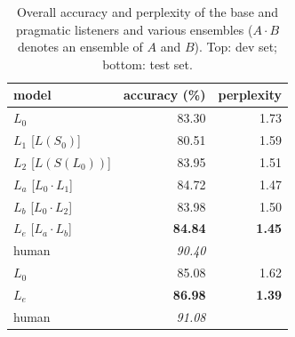 \documentclass[11pt,letterpaper]{article}
\newcommand{\Listener}{L}
\newcommand{\Speaker}{S}
\renewcommand{\|}{\mid}
\newcommand{\best}[1]{\textbf{#1}}
\newcommand{\oracle}[1]{\textit{#1}}
\newcommand{\secref}[1]{Section~\ref{#1}}
\begin{document}
\begin{table}[t]
\centering
\begin{tabular}{lrr}
  \toprule
  model & accuracy (\%) & perplexity \\
  \midrule
  $\Listener_0$                                      & 83.30 & 1.73 \\
  $\Listener_1$ [$\Listener(\Speaker_0)$]            & 80.51 & 1.59 \\
  $\Listener_2$ [$\Listener(\Speaker(\Listener_0))$] & 83.95 & 1.51 \\
  $\Listener_a$ [$\Listener_0 \cdot \Listener_1$]    & 84.72 & 1.47 \\
  $\Listener_b$ [$\Listener_0 \cdot \Listener_2$]    & 83.98 & 1.50 \\
  $\Listener_e$ [$\Listener_a \cdot \Listener_b$]    & \best{84.84} & \best{1.45}
  \\[0.5ex]
  human & \oracle{90.40} \\
  \midrule
  $\Listener_0$                                      & 85.08 & 1.62 \\
  $\Listener_e$                                      & \best{86.98} & \best{1.39}
  \\[0.5ex]
  human & \oracle{91.08} \\
  \bottomrule
\end{tabular}
\caption{Overall accuracy and perplexity of the base and pragmatic listeners and
various ensembles ($A \cdot B$ denotes an ensemble of $A$ and $B$).
Top: dev set; bottom: test set.}
\label{table:modelAccuracy}
\end{table}

\end{document}
